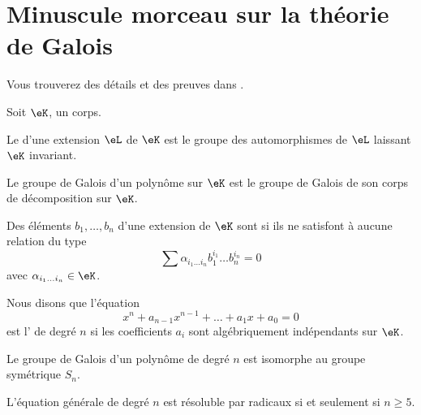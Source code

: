 \section{Minuscule morceau sur la théorie de Galois}

Vous trouverez des détails et des preuves dans \cite{GalIEl}.

\begin{definition}
    Soit $\eK$, un corps.
    
    Le  d'une extension \( \eL\) de \( \eK\) est le groupe des automorphismes de \( \eL\) laissant \( \eK\) invariant. 

    Le groupe de Galois d'un polynôme sur \( \eK\) est le groupe de Galois de son corps de décomposition sur \( \eK\).
\end{definition}

\begin{definition}
    Des éléments \( b_1,\ldots, b_n\) d'une extension de \( \eK\) sont  si ils ne satisfont à aucune relation du type
    \begin{equation}
        \sum \alpha_{i_1\ldots i_n}b_1^{i_1}\ldots b_n^{i_n}=0
    \end{equation}
    avec \( \alpha_{i_1\ldots i_n}\in \eK\).
\end{definition}

Nous disons que l'équation
\begin{equation}
    x^n+a_{n-1}x^{n-1}+\ldots+a_1x+a_0=0
\end{equation}
est l' de degré \( n\) si les coefficients \( a_i\) sont algébriquement indépendants sur \( \eK\).

\begin{theorem}
    Le groupe de Galois d'un polynôme de degré \( n\) est isomorphe au groupe symétrique \( S_n\).
\end{theorem}

\begin{corollary}
    L'équation générale de degré \( n\) est résoluble par radicaux si et seulement si \( n\geq 5\).
\end{corollary}

